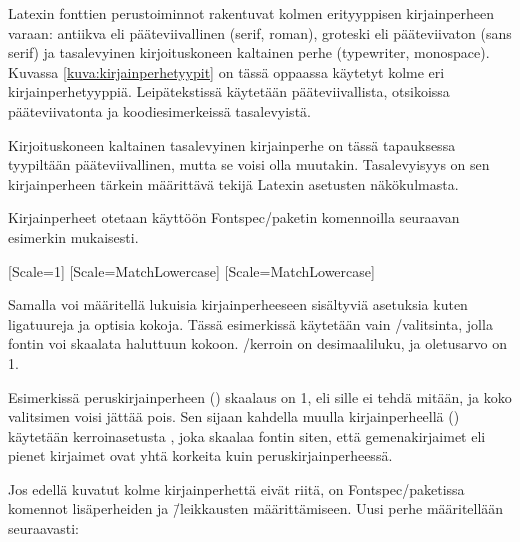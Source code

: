Latexin fonttien perus\-toiminnot rakentuvat kolmen erityyppisen
kirjainperheen varaan: antiikva eli pääteviivallinen
(\textenglish{serif, roman}), groteski eli pääteviivaton
(\textenglish{sans serif}) ja tasalevyinen kirjoituskoneen kaltainen
perhe (\textenglish{typewriter, monospace}). Kuvassa
\ref{kuva:kirjainperhetyypit} on tässä oppaassa käytetyt kolme eri
kirjainperhetyyppiä. Leipätekstissä käytetään pääteviivallista,
otsikoissa pääteviivatonta ja koodi\-esimerkeissä tasalevyistä.


Kirjoituskoneen kaltainen tasalevyinen kirjainperhe on tässä tapauksessa
tyypiltään pääteviivallinen, mutta se voisi olla muutakin. Tasalevyisyys
on sen kirjainperheen tärkein määrittävä tekijä Latexin asetusten
näkökulmasta.

Kirjainperheet otetaan käyttöön Fontspec\-/paketin komennoilla seuraavan
esimerkin mukaisesti.

\begin{koodilohkosis}
  \usepackage{fontspec}
  \setmainfont{Linux Libertine O}[Scale=1]
  \setsansfont{Linux Biolinum O}[Scale=MatchLowercase]
  \setmonofont{Linux Libertine Mono O}[Scale=MatchLowercase]
\end{koodilohkosis}

Samalla voi määritellä lukuisia kirjainperheeseen sisältyviä asetuksia
kuten ligatuureja ja optisia kokoja. Tässä esimerkissä käytetään vain
\-/valitsinta, jolla fontin voi skaalata haluttuun kokoon.
\-/kerroin on desimaaliluku, ja oletus\-arvo on 1.

Esimerkissä peruskirjainperheen () skaalaus on
1, eli sille ei tehdä mitään, ja koko valitsimen voisi jättää pois. Sen
sijaan kahdella muulla kirjainperheellä () käytetään ker\-roin\-ase\-tus\-ta
, joka skaalaa fontin siten, että gemenakirjaimet
eli pienet kirjaimet ovat yhtä korkeita kuin peruskirjainperheessä.

Jos edellä kuvatut kolme kirjainperhettä eivät riitä, on
Fontspec\-/paketissa komennot lisäperheiden ja \=/leikkausten
määrittämiseen. Uusi perhe määritellään seuraavasti:

